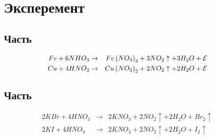 
\section{Эксперемент}
\subsection{Часть}
\begin{eqnarray}
    Fe + 6NHO_3 &\to& 
    Fe\left( NO_3 \right)_3 + 3NO_2 \uparrow + 3H_2O + \mathcal{E} \\
    Cu + 4HNO_3 &\to& 
    Cu\left( NO_3 \right)_2 + 2NO_2 \uparrow + 2H_2O + \mathcal{E}
\end{eqnarray}

\subsection{Часть}

\begin{eqnarray}
    2KBr + 4HNO_3 &\to& 2KNO_3 + 2NO_2 \uparrow + 2H_2O + Br_2 \uparrow \\
    2KI + 4HNO_3 &\to& 2KNO_3 + 2NO_2 \uparrow + 2H_2O + I_2 \uparrow
\end{eqnarray}










